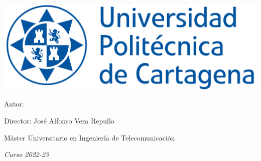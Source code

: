 \begin{titlepage}
    \vspace{5cm}
    {\centering
        \hspace{3cm}\includegraphics[width=.7\textwidth]{images/UPCT-front.jpg}
        
        \vspace{5cm}
        \hspace{2cm}\huge\textbf{\color{RoyalBlue} \mytitle} 
        
        {\LARGE
        \vspace*{\fill}
        \begin{flushright}
          \item Autor: \myname
          \item Director: José Alfonso Vera Repullo 
          \item Máster Universitario en Ingeniería de Telecomunicación
          \item \textit{Curso 2022-23}   
        \end{flushright}
        }
    }
\end{titlepage}
